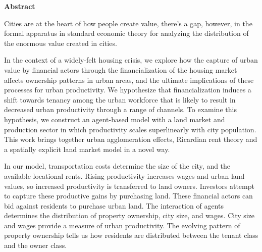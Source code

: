 \begin{center}\textbf{Abstract}\end{center}

Cities are at the heart of how people create value, there's a gap, however, in the formal apparatus in standard economic theory for analyzing the distribution of the enormous value created in cities.


In the context of a widely-felt housing crisis, we explore how the capture of urban value by financial actors through the financialization of the housing market affects ownership patterns in urban areas, and the ultimate implications of these processes for urban productivity.  We hypothesize that financialization induces a shift towards tenancy among the urban workforce that is likely to result in decreased urban productivity through a range of channels. To examine this hypothesis, we construct an agent-based model with a land market and production sector in which productivity scales superlinearly with city population. This work brings together urban agglomeration effects, Ricardian rent theory and a spatially explicit land market model in a novel way. 

In our model, transportation costs determine the size of the city, and the available locational rents. Rising productivity increases wages and urban land values, so increased productivity is transferred to land owners. Investors attempt to capture these productive gains by purchasing land. These financial actors can bid against residents to purchase urban land. The interaction of agents determines the distribution of property ownership,  city size, and wages. City size and wages provide a measure of urban productivity. The evolving pattern of property ownership tells us how residents are distributed between the tenant class and the owner class. 


